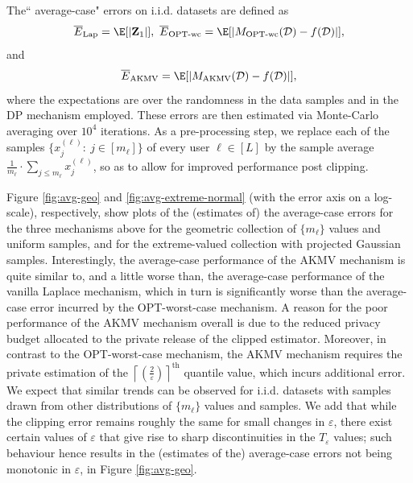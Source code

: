 \documentclass[conference,letterpaper]{IEEEtran}
\theoremstyle{remark}
\theoremstyle{definition}
\begin{document}
The`` average-case" errors on i.i.d. datasets are defined as
$$\overline{E}_\text{Lap} = \E[|\mathbf{Z}_1|],\ \overline{E}_\text{OPT-wc} = \E[|M_{\text{OPT-wc}}(\mathcal{D}) - f(\mathcal{D})|],$$
and
$$ \overline{E}_\text{AKMV} = \E[|M_{\text{AKMV}}(\mathcal{D}) - f(\mathcal{D})|],$$
where the expectations are over the randomness in the data samples and in the DP mechanism employed. These errors 
are then estimated via Monte-Carlo averaging over $10^4$ iterations. As a pre-processing step, we replace each of the samples $\{x_j^{(\ell)}:\ j\in [m_\ell]\}$ of every user $\ell \in [L]$ by the sample average $\frac{1}{m_\ell}\cdot \sum_{j\leq m_\ell} x_j^{(\ell)}$, so as to allow for improved performance post clipping. 

Figure \ref{fig:avg-geo} and \ref{fig:avg-extreme-normal} (with the error axis on a log-scale), respectively, show plots of the (estimates of) the average-case errors for the three mechanisms above for the geometric collection of $\{m_\ell\}$ values and uniform samples, and for the extreme-valued collection with projected Gaussian samples. Interestingly, the average-case performance of the AKMV mechanism is quite similar to, and a little worse than, the average-case performance of the vanilla Laplace mechanism, which in turn is significantly worse than the average-case error incurred by the OPT-worst-case mechanism. A reason for the poor performance of the AKMV mechanism overall is due to the reduced privacy budget allocated to the private release of the clipped estimator. Moreover, in contrast to the OPT-worst-case mechanism, the AKMV mechanism requires the private estimation of the $\left \lceil \left(\frac{2}{\varepsilon}\right)\right \rceil^{\text{th}}$ quantile value, which incurs additional error. We expect that similar trends can be observed for i.i.d. datasets with samples drawn from other distributions of $\{m_\ell\}$ values and samples. We add that while the clipping error remains roughly the same for small changes in $\varepsilon$, there exist certain values of $\varepsilon$ that give rise to sharp discontinuities in the $T_\varepsilon$ values; such behaviour hence results in the (estimates of the) average-case errors not being monotonic in $\varepsilon$, in Figure \ref{fig:avg-geo}.
\end{document}
